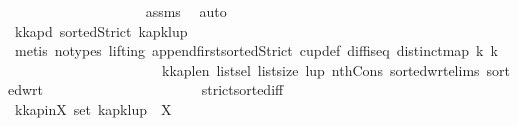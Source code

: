 \begin{isabellebody}
\ \ \ \ \ \ \ \ \ \ \ \ \ \ \ \ \ \ \isamarkupfalse%
\ assms{\isacharparenleft}{\kern0pt}{}{\isacharparenright}{\kern0pt}\ \isamarkupfalse%
\ auto\isanewline
\ \ \ \ \ \ \ \ \ \ \ \ \ \ \ \ \isamarkupfalse%
\ k{\isacharunderscore}{\kern0pt}kap{\isacharunderscore}{\kern0pt}d{\isacharcolon}{\kern0pt}\ {\isachardoublequoteopen}sortedStrict\ {\isacharparenleft}{\kern0pt}kap{\isacharbang}{\kern0pt}{\isacharparenleft}{\kern0pt}k{\isacharminus}{\kern0pt}{}{\isacharparenright}{\kern0pt}{\isacharhash}{\kern0pt}lup{\isacharparenright}{\kern0pt}{\isachardoublequoteclose}\isanewline
\ \ \ \ \ \ \ \ \ \ \ \ \ \ \ \ \ \ \isamarkupfalse%
\ {\isacharparenleft}{\kern0pt}metis\ {\isacharparenleft}{\kern0pt}no{\isacharunderscore}{\kern0pt}types{\isacharcomma}{\kern0pt}\ lifting{\isacharparenright}{\kern0pt}\ append{\isacharunderscore}{\kern0pt}first{\isacharunderscore}{\kern0pt}sortedStrict\ cup{\isacharunderscore}{\kern0pt}def\ diff{\isacharunderscore}{\kern0pt}is{\isacharunderscore}{\kern0pt}{}{\isacharunderscore}{\kern0pt}eq\ distinct{\isacharunderscore}{\kern0pt}map\ k{}\ k{}\isanewline
\ \ \ \ \ \ \ \ \ \ \ \ \ \ \ \ \ \ \ \ \ \ k{\isacharunderscore}{\kern0pt}kap{\isacharunderscore}{\kern0pt}len\ list{\isachardot}{\kern0pt}sel{\isacharparenleft}{\kern0pt}{}{\isacharparenright}{\kern0pt}\ list{\isachardot}{\kern0pt}size{\isacharparenleft}{\kern0pt}{}{\isacharparenright}{\kern0pt}\ lup{\isacharparenleft}{\kern0pt}{}{\isacharcomma}{\kern0pt}{}{\isacharparenright}{\kern0pt}\ nth{\isacharunderscore}{\kern0pt}Cons{\isacharunderscore}{\kern0pt}{}\ sorted{\isacharunderscore}{\kern0pt}wrt{\isachardot}{\kern0pt}elims{\isacharparenleft}{\kern0pt}{}{\isacharparenright}{\kern0pt}\ sorted{\isacharunderscore}{\kern0pt}wrt{}{}\isanewline
\ \ \ \ \ \ \ \ \ \ \ \ \ \ \ \ \ \ \ \ \ \ strict{\isacharunderscore}{\kern0pt}sorted{\isacharunderscore}{\kern0pt}iff{\isacharparenright}{\kern0pt}\isanewline
\ \ \ \ \ \ \ \ \ \ \ \ \ \ \ \ \isamarkupfalse%
\ k{\isacharunderscore}{\kern0pt}kap{\isacharunderscore}{\kern0pt}inX{\isacharcolon}{\kern0pt}\ {\isachardoublequoteopen}set\ {\isacharparenleft}{\kern0pt}kap{\isacharbang}{\kern0pt}{\isacharparenleft}{\kern0pt}k{\isacharminus}{\kern0pt}{}{\isacharparenright}{\kern0pt}{\isacharhash}{\kern0pt}lup{\isacharparenright}{\kern0pt}\ {\isasymsubseteq}\ X{\isachardoublequoteclose}\isanewline
\ \ \ \ \ \ \ \ \ \ \ \ \ \ \ \ \ \ \isamarkupfalse%

\end{isabellebody}
